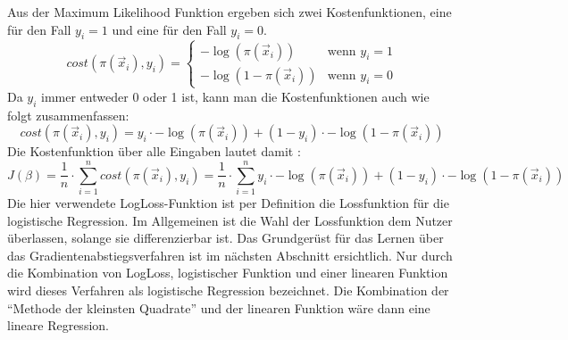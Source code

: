 Aus der Maximum Likelihood Funktion ergeben sich zwei Kostenfunktionen, eine für den Fall $y_i =1$ und eine für den Fall $y_i=0$.
\begin{displaymath}
cost(\pi(\vec x_i), y_i)= \begin{cases}
-\log(\pi(\vec x_i)) & \text{wenn } y_i=1\\
-\log(1-\pi(\vec x_i)) & \text{wenn } y_i=0
\end{cases}
\end{displaymath}
Da $y_i$ immer entweder 0 oder 1 ist, kann man die Kostenfunktionen auch wie folgt zusammenfassen:
\begin{displaymath}
cost(\pi (\vec x_i), y_i) = y_i \cdot -\log(\pi(\vec x_i)) + (1-y_i) \cdot -\log(1-\pi(\vec x_i))
\end{displaymath}
Die Kostenfunktion über alle Eingaben lautet damit \cite{HER}:
\begin{displaymath}
J(\beta)=\dfrac{1}{n} \cdot \sum_{i=1}^n cost(\pi(\vec x_i), y_i) = \dfrac{1}{n} \cdot \sum_{i=1}^n y_i \cdot -\log(\pi(\vec x_i)) + (1-y_i) \cdot -\log(1-\pi(\vec x_i))
\end{displaymath}
Die hier verwendete LogLoss-Funktion ist per Definition die Lossfunktion für die logistische Regression. Im Allgemeinen ist die Wahl der Lossfunktion dem Nutzer überlassen, solange sie differenzierbar ist. Das Grundgerüst für das Lernen über das Gradientenabstiegsverfahren ist im nächsten Abschnitt ersichtlich. Nur durch die Kombination von LogLoss, logistischer Funktion und einer linearen Funktion wird dieses Verfahren als logistische Regression bezeichnet. Die Kombination der "`Methode der kleinsten Quadrate"' und der linearen Funktion wäre dann eine lineare Regression.
